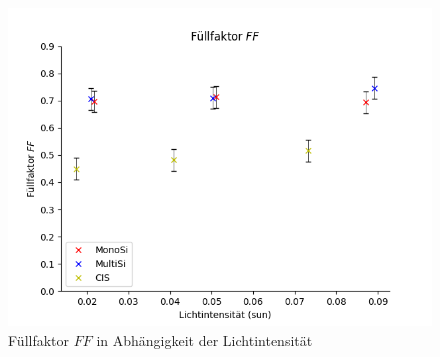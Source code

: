 \begin{figure}[ht]
    \centering
    \includegraphics[width = \linewidth]{Bilder/PlotFFInt.png}
    \caption{Füllfaktor $FF$ in Abhängigkeit der Lichtintensität}  
\end{figure}
